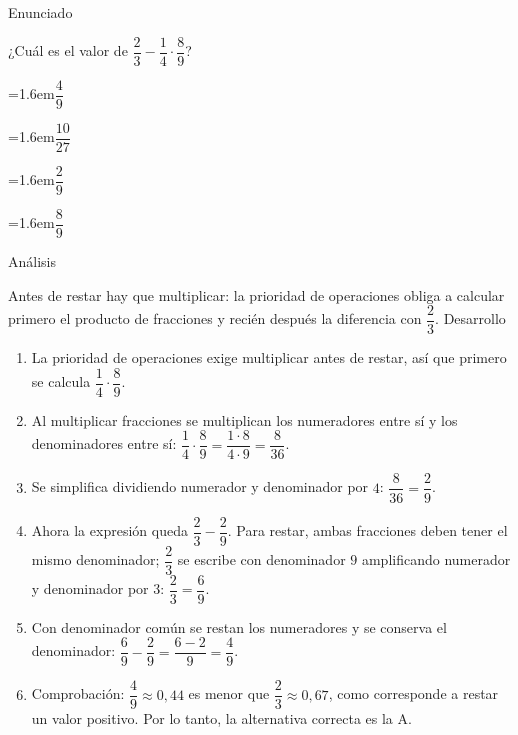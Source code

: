 \documentclass[10pt,a4paper,twocolumn]{article}
\newcommand{\alternativa}[2]{\par\noindent\hangindent=1.6em\hangafter=1\makebox[1.6em][l]{\tecla{#1}}#2\par}
\newcommand{\clave}[1]{\par\smallskip{\sffamily\footnotesize\color{esmeralda} Clave \teclaok{#1}}\par}
\begin{document}
\begin{ejemplo}
{\sffamily\footnotesize\color{zinc500} Enunciado}\par
¿Cuál es el valor de $\dfrac{2}{3} - \dfrac{1}{4}\cdot\dfrac{8}{9}$?
\alternativa{A}{$\dfrac{4}{9}$}
\alternativa{B}{$\dfrac{10}{27}$}
\alternativa{C}{$\dfrac{2}{9}$}
\alternativa{D}{$\dfrac{8}{9}$}
\clave{A}
{\sffamily\footnotesize\color{zinc500} Análisis}\par Antes de restar hay que multiplicar: la prioridad de operaciones obliga a calcular primero el producto de fracciones y recién después la diferencia con $\dfrac{2}{3}$.
{\sffamily\footnotesize\color{zinc500} Desarrollo}
\begin{enumerate}
  \item La prioridad de operaciones exige multiplicar antes de restar, así que primero se calcula $\dfrac{1}{4}\cdot\dfrac{8}{9}$.
  \item Al multiplicar fracciones se multiplican los numeradores entre sí y los denominadores entre sí: $\dfrac{1}{4}\cdot\dfrac{8}{9} = \dfrac{1\cdot 8}{4\cdot 9} = \dfrac{8}{36}$.
  \item Se simplifica dividiendo numerador y denominador por $4$: $\dfrac{8}{36} = \dfrac{2}{9}$.
  \item Ahora la expresión queda $\dfrac{2}{3} - \dfrac{2}{9}$. Para restar, ambas fracciones deben tener el mismo denominador; $\dfrac{2}{3}$ se escribe con denominador $9$ amplificando numerador y denominador por $3$: $\dfrac{2}{3} = \dfrac{6}{9}$.
  \item Con denominador común se restan los numeradores y se conserva el denominador: $\dfrac{6}{9} - \dfrac{2}{9} = \dfrac{6-2}{9} = \dfrac{4}{9}$.
  \item Comprobación: $\dfrac{4}{9}\approx 0{,}44$ es menor que $\dfrac{2}{3}\approx 0{,}67$, como corresponde a restar un valor positivo. Por lo tanto, la alternativa correcta es la A.
\end{enumerate}
\end{ejemplo}
\end{document}
